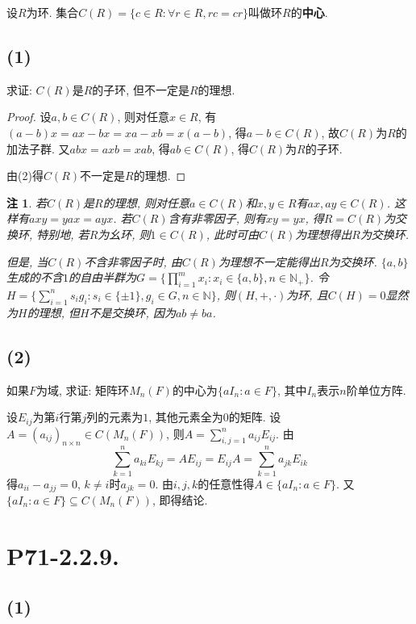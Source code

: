 \documentclass[12pt, a4paper, fontset=windows]{ctexart}
\newcommand{\N}{\mathbb{N}}
\newtheorem*{remark}{注}
\begin{document}
设$R$为环. 集合$C(R)=\{c\in R:\forall r\in R,rc=cr\}$叫做环$R$的{\bf 中心}. 

\subsection*{(1)}

求证: $C(R)$是$R$的子环, 但不一定是$R$的理想. 

\begin{proof}
设$a,b\in C(R)$, 则对任意$x\in R$, 有$(a-b)x=ax-bx=xa-xb=x(a-b)$, 得$a-b\in C(R)$, 
故$C(R)$为$R$的加法子群. 又$abx=axb=xab$, 得$ab\in C(R)$, 得$C(R)$为$R$的子环. 

由(2)得$C(R)$不一定是$R$的理想. 
\end{proof}

\begin{remark}
若$C(R)$是$R$的理想, 则对任意$a\in C(R)$和$x,y\in R$有$ax,ay\in C(R)$. 
这样有$axy=yax=ayx$. 若$C(R)$含有非零因子, 则有$xy=yx$, 得$R=C(R)$为交换环, 
特别地, 若$R$为幺环, 则$1\in C(R)$, 此时可由$C(R)$为理想得出$R$为交换环. 

但是, 当$C(R)$不含非零因子时, 由$C(R)$为理想不一定能得出$R$为交换环. 
$\{a,b\}$生成的不含$1$的自由半群为$G=\{\prod^m_{i=1}x_i:x_i\in\{a,b\},n\in\N_+\}$. 
令$H=\{\sum^n_{i=1}s_ig_i:s_i\in\{\pm 1\},g_i\in G,n\in\N\}$, 则$(H,+,\cdot)$为环, 
且$C(H)=0$显然为$H$的理想, 但$H$不是交换环, 因为$ab\ne ba$. 

\end{remark}

\subsection*{(2)}

如果$F$为域, 求证: 矩阵环$M_n(F)$的中心为$\{aI_n:a\in F\}$, 其中$I_n$表示$n$阶单位方阵. 

设$E_{ij}$为第$i$行第$j$列的元素为$1$, 其他元素全为$0$的矩阵. 
设$A=(a_{ij})_{n\times n}\in C(M_n(F))$, 则$A=\sum^n_{i,j=1}a_{ij}E_{ij}$. 
由\[\sum^n_{k=1}a_{ki}E_{kj}=AE_{ij}=E_{ij}A=\sum^n_{k=1}a_{jk}E_{ik}\]
得$a_{ii}-a_{jj}=0$, $k\ne i$时$a_{jk}=0$. 由$i,j,k$的任意性得$A\in\{aI_n:a\in F\}$. 
又$\{aI_n:a\in F\}\subseteq C(M_n(F))$, 即得结论. 

\section*{P71-2.2.9.}

\subsection*{(1)}
\end{document}
